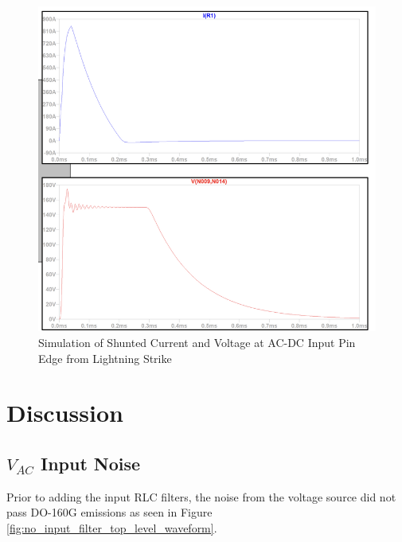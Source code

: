 \documentclass[conference]{IEEEtran}
\begin{document}
\begin{figure}[h]
    \centering
    \includegraphics[width=1.0\linewidth]{tvs_shunted_current_and_voltage.png}
    \caption{Simulation of Shunted Current and Voltage at AC-DC Input Pin Edge from Lightning Strike}
    \label{fig:tvs_shunted_current_and_voltage_waveform}
\end{figure}

\FloatBarrier

\section{Discussion}
\subsection{$V_{AC}$ Input Noise}
Prior to adding the input RLC filters, the noise from the voltage source did not pass DO-160G emissions as seen in Figure \ref{fig:no_input_filter_top_level_waveform}. 
\end{document}
